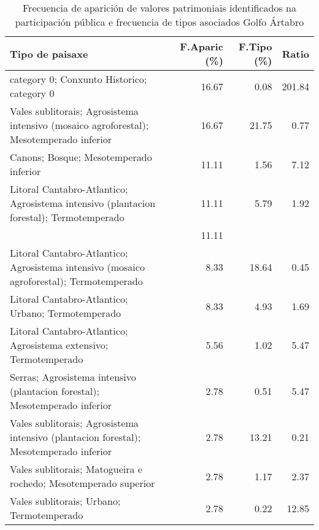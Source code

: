 \begin{table}[p]
\centering
\caption{Frecuencia de aparición de valores patrimoniais identificados na participación pública e frecuencia de tipos asociados Golfo Ártabro} 
\label{vsixotpat1}
\begin{tabular}{lrrr}
  \hline
Tipo de paisaxe & F.Aparic (\%) & F.Tipo (\%) & Ratio \\ 
  \hline
category 0; Conxunto Historico; category 0 & 16.67 & 0.08 & 201.84 \\ 
  Vales sublitorais; Agrosistema intensivo (mosaico agroforestal); Mesotemperado inferior & 16.67 & 21.75 & 0.77 \\ 
  Canons; Bosque; Mesotemperado inferior & 11.11 & 1.56 & 7.12 \\ 
  Litoral Cantabro-Atlantico; Agrosistema intensivo (plantacion forestal); Termotemperado & 11.11 & 5.79 & 1.92 \\ 
   & 11.11 &  &  \\ 
  Litoral Cantabro-Atlantico; Agrosistema intensivo (mosaico agroforestal); Termotemperado & 8.33 & 18.64 & 0.45 \\ 
  Litoral Cantabro-Atlantico; Urbano; Termotemperado & 8.33 & 4.93 & 1.69 \\ 
  Litoral Cantabro-Atlantico; Agrosistema extensivo; Termotemperado & 5.56 & 1.02 & 5.47 \\ 
  Serras; Agrosistema intensivo (plantacion forestal); Mesotemperado inferior & 2.78 & 0.51 & 5.47 \\ 
  Vales sublitorais; Agrosistema intensivo (plantacion forestal); Mesotemperado inferior & 2.78 & 13.21 & 0.21 \\ 
  Vales sublitorais; Matogueira e rochedo; Mesotemperado superior & 2.78 & 1.17 & 2.37 \\ 
  Vales sublitorais; Urbano; Termotemperado & 2.78 & 0.22 & 12.85 \\ 
   \hline
\end{tabular}
\end{table}
